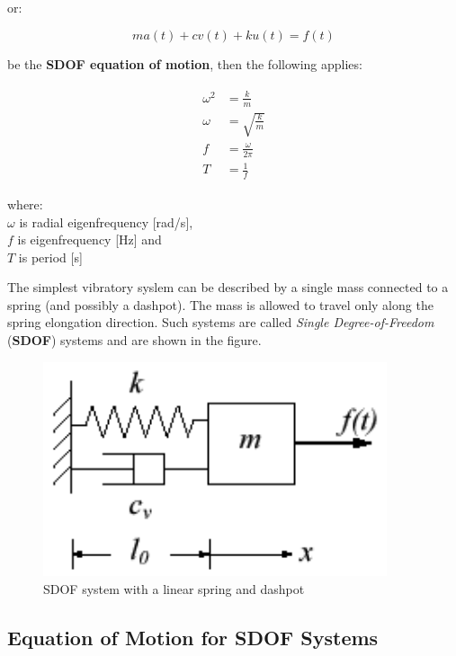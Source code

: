 \documentclass[10pt,b5paper,titlepage]{book}
\newenvironment{ematrix}
{
    \begin{eqnarray}
        \begin{aligned}
}
{
        \end{aligned}
    \end{eqnarray}
}
\begin{document}
or:

\begin{equation}
    m a(t) + c v(t) + k u(t) = f(t)
\end{equation}

be the \textbf{SDOF equation of motion}, then the following applies:

\begin{ematrix}
    \omega^2 &= \frac{k}{m} \\
    \omega &= \sqrt{\frac{k}{m}} \\
    f &= \frac{\omega}{2 \pi} \\
    T &= \frac{1}{f}
\end{ematrix}

where:\\
$ \omega $ is radial eigenfrequency [rad/s],\\
$ f $ is eigenfrequency [Hz] and\\
$ T $ is period [s]

The simplest vibratory syslem can be described by a single mass connected to a spring
(and possibly a dashpot). The mass is allowed to travel only along the spring elongation
direction. Such systems are called \textit{Single Degree-of-Freedom} (\textbf{SDOF})
systems and are shown in the figure.

\begin{figure}[ht]
    \centering
    \includegraphics[width=0.90\textwidth]{img/SDOF_plot.png}
    \caption{SDOF system with a linear spring and dashpot}
    \label{fig:SDOF-plot-png}
\end{figure}

\subsection{Equation of Motion for SDOF Systems}
\end{document}
